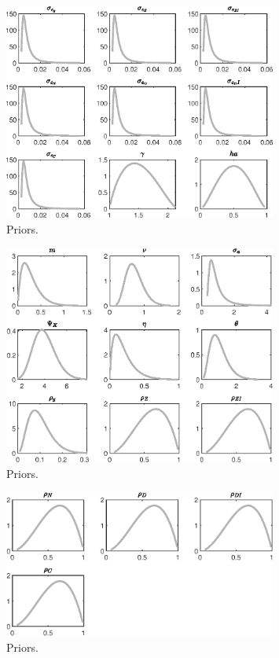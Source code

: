  
\begin{figure}[H]
\centering
\includegraphics[width=0.80\textwidth]{BRS_growth_util_sectoral/graphs/BRS_growth_util_sectoral_Priors1}
\caption{Priors.}\label{Fig:Priors:1}
\end{figure}
\begin{figure}[H]
\centering
\includegraphics[width=0.80\textwidth]{BRS_growth_util_sectoral/graphs/BRS_growth_util_sectoral_Priors2}
\caption{Priors.}\label{Fig:Priors:2}
\end{figure}
\begin{figure}[H]
\centering
\includegraphics[width=0.80\textwidth]{BRS_growth_util_sectoral/graphs/BRS_growth_util_sectoral_Priors3}
\caption{Priors.}\label{Fig:Priors:3}
\end{figure}
 

